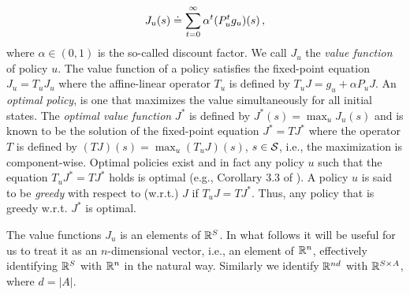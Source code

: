 \documentclass[12pt,draftcls,onecolumn]{IEEEtran}
\begin{document}
\begin{align}
J_u(s)\defeq \sum_{t=0}^\infty \alpha^t (P_u^t g_u)(s)\,,\nn
\end{align}
where  $\alpha \in (0,1)$ is the so-called discount factor. %
We call $J_u$ the \emph{value function} of policy $u$. The value function of a policy satisfies the fixed-point equation $J_u = T_u J_u$ where the affine-linear operator $T_u$ is defined by $T_u J = g_u + \alpha P_u J$.
An \emph{optimal policy}, is one that maximizes the value simultaneously for all initial states.
The \emph{optimal value function} $J^*$ is defined by $J^*(s) = \max_u J_u(s)$ and is known to be the solution of the fixed-point equation $J^* = T J^*$ where the operator $T$ is defined by $(TJ)(s) = \max_u (T_u J)(s)$, $s\in \S$, i.e., the maximization is component-wise. Optimal policies exist and in fact any policy $u$ such that the equation $T_u J^* = T J^*$ holds is optimal (e.g., Corollary 3.3 of \cite{Kall17}). A policy $u$ is said to be \emph{greedy} with respect to (w.r.t.) $J$ if $T_u J = T J^*$. Thus, any policy that is greedy w.r.t. $J^*$ is optimal.

The value functions $J_u$ is an elements of $\R^S$. In what follows it will be useful for us to treat it as an $n$-dimensional vector, i.e., an element of $\R^n$, effectively identifying $\R^S$ with $\R^n$ in the natural way. Similarly we identify $\R^{nd}$ with $\R^{S\times A}$, where $d=|A|$.
\end{document}

